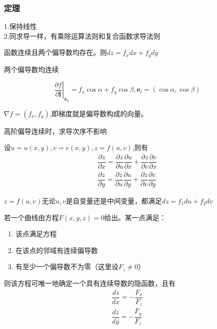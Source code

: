 \subsubsection{定理}
\begin{theorem}[梯度运算法则]
	1.保持线性\\
	2.同求导一样，有乘除运算法则和复合函数求导法则
\end{theorem}
\begin{theorem}[可微的必要条件]
	函数连续且两个偏导数均存在。则$ dz=f_xdx+f_ydy $
\end{theorem}
\begin{theorem}[可微的充分条件]
	两个偏导数均连续
\end{theorem}
\begin{theorem}
\begin{equation}\label{key}
		\left.\dfrac{\partial f }{\partial \bm{l}}\right |_{\bm{x}_0}=f_x\cos \alpha+f_y\cos \beta,\bm{e}_l=(\cos \alpha,\cos \beta)
\end{equation}
\end{theorem}
\begin{theorem}
	$\nabla f=(f_x,f_y)$,即梯度就是偏导数构成的向量。
\end{theorem}
\begin{theorem}
	高阶偏导连续时，求导次序不影响
\end{theorem}
\begin{theorem}[多元函数求导的链式法则]
	设$ u=u(x,y),v=v(x,y),z=f(u,v) $,则有
	\begin{align}\label{key}
		\dfrac{\partial z}{\partial x}=\dfrac{\partial z}{\partial u}\dfrac{\partial u}{\partial x}+\dfrac{\partial z}{\partial v}\dfrac{\partial v}{\partial x}\\
		\dfrac{\partial z}{\partial y}=\dfrac{\partial z}{\partial u}\dfrac{\partial u}{\partial y}+\dfrac{\partial z}{\partial v}\dfrac{\partial v}{\partial y}
	\end{align}
\end{theorem}
\begin{theorem}[一阶全微分形式不变性]
	$ z=f(u,v) $无论$ u,v $是自变量还是中间变量，都满足$ dz=f_1du+f_2dv $
\end{theorem}
\begin{theorem}
	若一个曲线由方程$ F(x,y,z)=0 $给出。某一点满足：
	\begin{enumerate}
		\item 该点满足方程
		\item 在该点的邻域有连续偏导数
		\item 有至少一个偏导数不为零（这里设$ F_z\neq 0 $）
	\end{enumerate}
则该方程可唯一地确定一个具有连续导数的隐函数，且有
\begin{align}\label{key}
	\dfrac{dz}{dx}=-\dfrac{F_x}{F_z}\\
	\dfrac{dz}{dy}=-\dfrac{F_y}{F_z}
\end{align}
\end{theorem}
